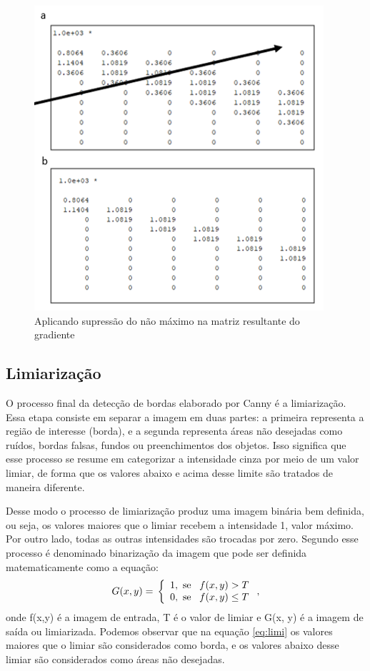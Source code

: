 \documentclass[a4paper,alpha-refs]{RBCA_v1.0}
\begin{document}
\begin{figure}[h!]
	\centering
	\includegraphics[width=.5\textwidth]{img/imgSu.png}
	\caption{Aplicando supressão do não máximo na matriz resultante do gradiente}
	\label{img:imgSu}
\end{figure}

\subsection{Limiarização}

O processo final da detecção de bordas elaborado por Canny é a limiarização. Essa etapa consiste em separar a imagem em duas partes: a primeira representa a região de interesse (borda), e a segunda representa áreas não desejadas como ruídos, bordas falsas, fundos ou preenchimentos dos objetos.  Isso significa que esse processo se resume em categorizar a intensidade cinza por meio de um valor limiar, de forma que os valores abaixo e acima desse limite são tratados de maneira diferente.
 
Desse modo o processo de limiarização produz uma imagem binária bem definida, ou seja, os valores maiores que o limiar recebem a intensidade 1, valor máximo. Por outro lado, todas as outras intensidades são trocadas por zero. Segundo \cite{ProcDigital} esse processo é denominado binarização da imagem que pode ser definida matematicamente como a equação:
\begin{equation}
G(x,y) = \\ 
\left\{
\begin{array}{cc}
 1 , \ \mbox{se} \;\;\; f(x,y)>T \\
 0 , \ \mbox{se} \;\;\; f(x,y) \leq T \\
\end{array}
\right.,
\label{eq:limi}	
\end{equation}     
onde f(x,y) é a imagem de entrada, T é o valor de limiar e G(x, y) é a imagem de saída ou limiarizada. Podemos observar que na equação \ref{eq:limi} os valores maiores que o limiar são considerados como borda, e os valores abaixo desse limiar são considerados como áreas não desejadas.
\end{document}
